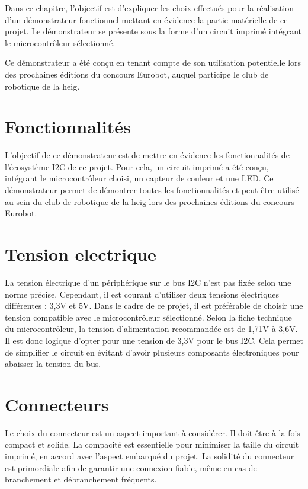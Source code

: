 Dans ce chapitre, l'objectif est d'expliquer les choix effectués pour la réalisation d'un démonstrateur fonctionnel mettant en évidence la partie matérielle de ce projet.
Le démonstrateur se présente sous la forme d'un circuit imprimé intégrant le microcontrôleur sélectionné.

Ce démonstrateur a été conçu en tenant compte de son utilisation potentielle lors des prochaines éditions du concours Eurobot, auquel participe le club de robotique de la \gls{heig}.

\section{Fonctionnalités}

L'objectif de ce démonstrateur est de mettre en évidence les fonctionnalités de l'écosystème I2C de ce projet.
Pour cela, un circuit imprimé a été conçu, intégrant le microcontrôleur choisi, un capteur de couleur et une LED.
Ce démonstrateur permet de démontrer toutes les fonctionnalités et peut être utilisé au sein du club de robotique de la \gls{heig} lors des prochaines éditions du concours Eurobot.

\section{Tension electrique}

La tension électrique d'un périphérique sur le bus I2C n'est pas fixée selon une norme précise.
Cependant, il est courant d'utiliser deux tensions électriques différentes : 3,3V et 5V.
Dans le cadre de ce projet, il est préférable de choisir une tension compatible avec le microcontrôleur sélectionné.
Selon la fiche technique du microcontrôleur, la tension d'alimentation recommandée est de 1,71V à 3,6V.
Il est donc logique d'opter pour une tension de 3,3V pour le bus I2C.
Cela permet de simplifier le circuit en évitant d'avoir plusieurs composants électroniques pour abaisser la tension du bus.

\section{Connecteurs}

Le choix du connecteur est un aspect important à considérer.
Il doit être à la fois compact et solide.
La compacité est essentielle pour minimiser la taille du circuit imprimé, en accord avec l'aspect embarqué du projet.
La solidité du connecteur est primordiale afin de garantir une connexion fiable, même en cas de branchement et débranchement fréquents.

